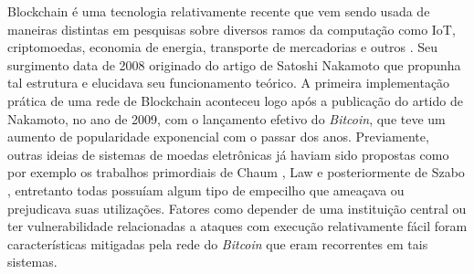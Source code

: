 Blockchain é uma tecnologia relativamente recente que vem sendo usada de maneiras distintas em pesquisas sobre diversos ramos da computação como \ac{IoT}, criptomoedas, economia de energia, transporte de mercadorias e outros \cite{blockchain:iot, blockchain:survey, blockchain:energia_dc}. Seu surgimento data de 2008 originado do artigo de Satoshi Nakamoto  \cite{blockchain:bitcoin_whitepaper} que propunha tal estrutura e elucidava seu funcionamento teórico. A primeira implementação prática de uma rede de Blockchain aconteceu logo após a publicação do artido de Nakamoto, no ano de 2009, com o lançamento efetivo do \textit{Bitcoin}, que teve um aumento de popularidade exponencial com o passar dos anos. Previamente, outras ideias de sistemas de moedas eletrônicas já haviam sido propostas como por exemplo os trabalhos primordiais de Chaum  \cite{blockchain:chaum83}, Law \cite{blockchain:law1996make} e posteriormente de Szabo \cite{blockchain:szabo1998}, entretanto todas possuíam algum tipo de empecilho que ameaçava ou prejudicava suas utilizações. Fatores como depender de uma instituição central ou ter vulnerabilidade relacionadas a ataques com execução relativamente fácil \cite{blockchain:survey_bitcoin} foram características mitigadas pela rede do \textit{Bitcoin} que eram recorrentes em tais sistemas.

